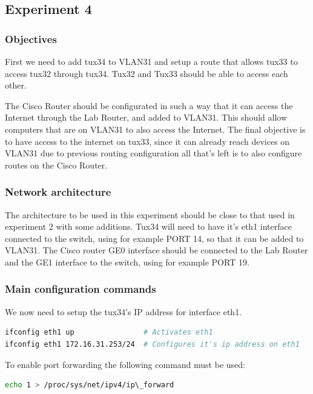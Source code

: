 \documentclass[a4paper,11pt,english]{article}
\begin{document}
    \subsection{Experiment 4}
        \subsubsection{Objectives}
            First we need to add tux34 to VLAN31 and setup a route that allows
            tux33 to access tux32 through tux34. Tux32 and Tux33 should be able to access
            each other.

            The Cisco Router should be configurated in such a way that it can access 
            the Internet through the Lab Router, and added to VLAN31. This should
            allow computers that are on VLAN31 to also access the Internet.
            The final objective is to have access to the internet on tux33, since it
            can already reach devices on VLAN31 due to previous routing configuration
            all that's left is to also configure routes on the Cisco Router.

        \subsubsection{Network architecture}
            The architecture to be used in this experiment should be close to that used
            in experiment 2 with some additions.
            Tux34 will need to have it's eth1 interface connected to the switch, using
            for example PORT 14, so that it can be added to VLAN31.
            The Cisco router GE0 interface should be connected to the Lab Router and 
            the GE1 interface to the switch, using for example PORT 19. 

        \subsubsection{Main configuration commands}
            We now need to setup the tux34's IP address for interface eth1.

\begin{lstlisting}[language=sh]
ifconfig eth1 up                # Activates eth1
ifconfig eth1 172.16.31.253/24  # Configures it's ip address on eth1
\end{lstlisting}
            
            \noindent To enable port forwarding the following command must be used:
\begin{lstlisting}[language=sh]
echo 1 > /proc/sys/net/ipv4/ip\_forward
\end{lstlisting}
\end{document}
